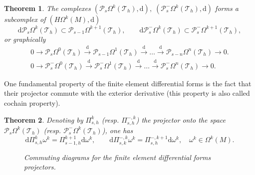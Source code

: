 \documentclass{elsarticle}
\newtheorem{theorem}{Theorem}
\renewcommand\d{\ensuremath{\mathrm{d}}}
\begin{document}
\begin{theorem}{\cite[Lemma 3.8]{arnold2006acta}}\label{th:fe_subcomplex}
The complexes $(\mathcal{P}_s\Omega^k(\mathcal{T}_h), \d), \; (\mathcal{P}_s^-\Omega^k(\mathcal{T}_h), \d)$ forms a subcomplex of $(H\Omega^k(M), \d)$
\begin{equation*}
    \d\mathcal{P}_s\Omega^k(\mathcal{T}_h) \subset \mathcal{P}_{s-1}\Omega^{k+1}(\mathcal{T}_h), \qquad \d\mathcal{P}^-_s\Omega^k(\mathcal{T}_h) \subset \mathcal{P}^-_s\Omega^{k+1}(\mathcal{T}_h),
\end{equation*}
or graphically
\begin{equation*}
\begin{aligned}
    0\longrightarrow \mathcal{P}_s\Omega^0(\mathcal{T}_h) \overset{\d}{\longrightarrow} \mathcal{P}_{s - 1}\Omega^1(\mathcal{T}_h) \overset{\d}{\longrightarrow} \dots \overset{\d}{\longrightarrow} \mathcal{P}_{s - n}\Omega^n(\mathcal{T}_h) \longrightarrow 0.\\
    0 \longrightarrow \mathcal{P}^-_s \Omega^0(\mathcal{T}_h) \overset{\d}{\longrightarrow} \mathcal{P}^-_s \Omega^1(\mathcal{T}_h) \overset{\d}{\longrightarrow} \dots
\overset{\d}{\longrightarrow} \mathcal{P}^-_s \Omega^n(\mathcal{T}_h) \longrightarrow 0.
\end{aligned}
\end{equation*}
\end{theorem}
One fundamental property of the finite element differential forms is the fact that their projector commute with the exterior derivative (this property is also called cochain property). 
\begin{theorem}\cite[Thm. 5.2.]{arnold2006acta}
Denoting by  $\Pi_{s, h}^{k}$ (resp. $\Pi_{s, h}^{-, k}$) the projector onto the space $\mathcal{P}_s\Omega^k(\mathcal{T}_h)$ (resp. $\mathcal{P}_s^-\Omega^k(\mathcal{T}_h)$), one has 
\begin{equation}
    \d \Pi_{s, h}^{k} \omega^k = \Pi_{s-1, h}^{k+1} \d \omega^k, \qquad \d \Pi_{s, k}^{-, k} \omega^k = \Pi_{s, h}^{-, k+1} \d \omega^k, \quad \omega^k \in \Omega^k(M).
\end{equation}

\begin{figure}[h]
\centering
{} \hspace{1cm}
\caption{Commuting diagrams for the finite element differential forms projectors.}
\label{fig:cd_FEDF}
\end{figure}
\end{theorem}





\end{document}
